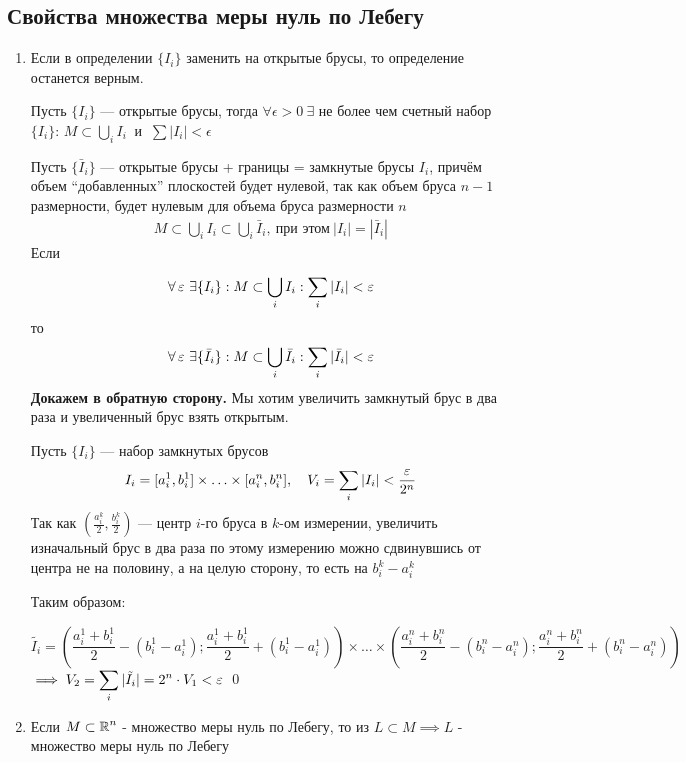 \documentclass[a4paper]{article}
\begin{document}
\subsection{Свойства множества меры нуль по Лебегу}
\begin{enumerate}
    \item {Если в определении $\{I_i\}$ заменить на открытые брусы, то определение останется верным.

    \proof Пусть $\{I_i\}$ — открытые брусы, тогда $\forall \epsilon > 0 \ \exists$ не более чем счетный набор $\{I_i\}$:
    $M\subset \displaystyle\bigcup_iI_i \ $ и $ \ \sum |I_i| < \epsilon$
    
    Пусть $\{\bar I_i\}$ — открытые брусы + границы = замкнутые брусы $I_i$, причём объем ``добавленных'' плоскостей будет нулевой, так как объем бруса $n-1$ размерности, будет нулевым для объема бруса размерности $n$
    \begin{equation*}
        \begin{aligned}
            M\subset\bigcup_iI_i \subset\bigcup_i\bar I_i, \ \text{при этом} \ |I_i| = |\bar I_i|
        \end{aligned}
    \end{equation*}
    Если


    \begin{equation*}
        \forall\ve\, \exists\{I_i\}: M \subset \bigcup_iI_i: \sum_i|I_i|<\ve
    \end{equation*}
    то
    \begin{equation*}
        \forall\ve\, \exists\{\bar I_i\}: M \subset \bigcup_i\bar I_i: \sum_i|\bar I_i|<\ve
    \end{equation*}
    \textbf{Докажем в обратную сторону.} Мы хотим увеличить замкнутый брус в два раза и увеличенный брус взять открытым.
    
    Пусть $\{I_i\}$ — набор замкнутых брусов
    \begin{equation*}
        I_i = [a^1_i, b^1_i]\times\ldots\times[a^n_i, b^n_i], \quad V_i = \sum_i|I_i|<\frac{\ve}{2^n}
    \end{equation*}
    Так как $\left(\frac{a_i^k}{2}, \frac{b_i^k}{2}\right)$ --- центр $i$-го бруса в $k$-ом измерении, увеличить изначальный брус в два раза по этому измерению можно сдвинувшись от центра не на половину, а на целую сторону, то есть на $b_i^k - a_i^k$

    Таким образом: 

    \begin{equation*}
        \tilde{I_i} = \left(\frac{a_i^1+b_i^1}{2} - (b_i^1-a_i^1) ; \frac{a_i^1 + b_i^1}{2} + (b_i^1 - a_i^1)\right) \times \ldots\times \left(\frac{a_i^n+b_i^n}{2} - (b_i^n-a_i^n) ; \frac{a_i^n + b_i^n}{2} + (b_i^n - a_i^n)\right)
    \end{equation*}
    $\implies V_2 = \displaystyle\sum_i|\tilde{I_i} | = 2^n \cdot V_1 < \ve$
    \qed
    }
    \item {Если $M \subset \operatorname{\mathbb{R}}^n$ - множество меры нуль по Лебегу, то из $L \subset M \implies L$ - множество меры нуль по Лебегу

}
\end{enumerate}
\end{document}
